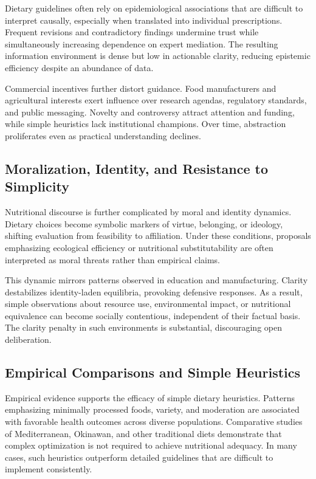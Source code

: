 \documentclass[11pt]{article}
\begin{document}
Dietary guidelines often rely on epidemiological associations that are difficult to interpret causally, especially when translated into individual prescriptions. Frequent revisions and contradictory findings undermine trust while simultaneously increasing dependence on expert mediation. The resulting information environment is dense but low in actionable clarity, reducing epistemic efficiency despite an abundance of data.

Commercial incentives further distort guidance. Food manufacturers and agricultural interests exert influence over research agendas, regulatory standards, and public messaging. Novelty and controversy attract attention and funding, while simple heuristics lack institutional champions. Over time, abstraction proliferates even as practical understanding declines.

\subsection{Moralization, Identity, and Resistance to Simplicity}

Nutritional discourse is further complicated by moral and identity dynamics. Dietary choices become symbolic markers of virtue, belonging, or ideology, shifting evaluation from feasibility to affiliation. Under these conditions, proposals emphasizing ecological efficiency or nutritional substitutability are often interpreted as moral threats rather than empirical claims.

This dynamic mirrors patterns observed in education and manufacturing. Clarity destabilizes identity-laden equilibria, provoking defensive responses. As a result, simple observations about resource use, environmental impact, or nutritional equivalence can become socially contentious, independent of their factual basis. The clarity penalty in such environments is substantial, discouraging open deliberation.

\subsection{Empirical Comparisons and Simple Heuristics}

Empirical evidence supports the efficacy of simple dietary heuristics. Patterns emphasizing minimally processed foods, variety, and moderation are associated with favorable health outcomes across diverse populations. Comparative studies of Mediterranean, Okinawan, and other traditional diets demonstrate that complex optimization is not required to achieve nutritional adequacy. In many cases, such heuristics outperform detailed guidelines that are difficult to implement consistently.
\end{document}
